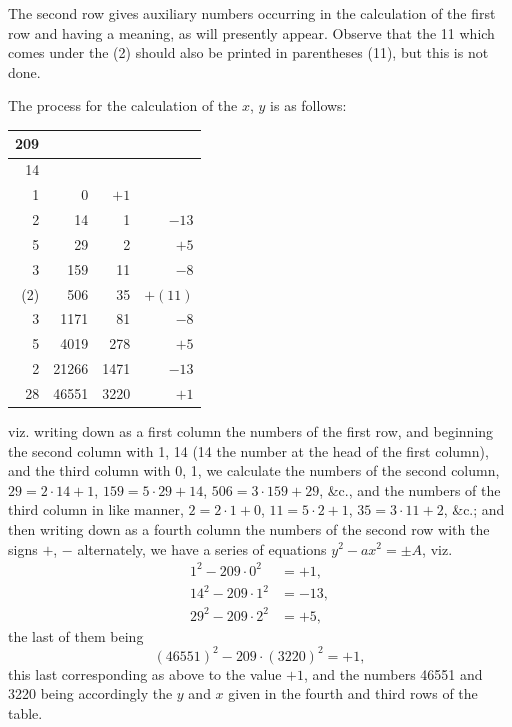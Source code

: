 \documentclass[11pt,a4paper]{book}
\begin{document}
The second row gives auxiliary numbers occurring in the calculation of the first row and having a meaning, as will presently appear. Observe that the 11 which comes under the (2) should also be printed in parentheses (11), but this is not done.

The process for the calculation of the $x$, $y$ is as follows:

\begin{center}
\begin{tabular}{r|r|r|r}
209 & & & \\ \hline
14 & & & \\
1 & 0 & $+1$ & \\
2 & 14 & 1 & $-13$ \\
5 & 29 & 2 & $+5$ \\
3 & 159 & 11 & $-8$ \\
(2) & 506 & 35 & $+(11)$ \\
3 & 1171 & 81 & $-8$ \\
5 & 4019 & 278 & $+5$ \\
2 & 21266 & 1471 & $-13$ \\
28 & 46551 & 3220 & $+1$
\end{tabular}
\end{center}

viz. writing down as a first column the numbers of the first row, and beginning the second column with 1, 14 (14 the number at the head of the first column), and the third column with 0, 1, we calculate the numbers of the second column, $29 = 2 \cdot 14 + 1$, $159 = 5 \cdot 29 + 14$, $506 = 3 \cdot 159 + 29$, \&c., and the numbers of the third column in like manner, $2 = 2 \cdot 1 + 0$, $11 = 5 \cdot 2 + 1$, $35 = 3 \cdot 11 + 2$, \&c.; and then writing down as a fourth column the numbers of the second row with the signs $+$, $-$ alternately, we have a series of equations $y^{2} - ax^{2} = \pm A$, viz.
\[
\begin{aligned}
1^{2} - 209 \cdot 0^{2} &= +1, \\
14^{2} - 209 \cdot 1^{2} &= -13, \\
29^{2} - 209 \cdot 2^{2} &= +5,
\end{aligned}
\]
the last of them being
\[ (46551)^{2} - 209 \cdot (3220)^{2} = +1, \]
this last corresponding as above to the value $+1$, and the numbers 46551 and 3220 being accordingly the $y$ and $x$ given in the fourth and third rows of the table.
\end{document}
